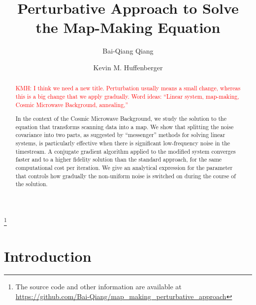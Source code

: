 \documentclass[twocolumn,linenumbers]{aastex631}
\newcommand{\kmh}[1]{\textcolor{red}{KMH: #1}}
\begin{document}
\title{Perturbative Approach to Solve the Map-Making Equation}

\footnote{
The source code and other information are available at \url{https://github.com/Bai-Qiang/map_making_perturbative_approach}
}

\author{Bai-Qiang Qiang}

\author[0000-0001-7109-0099]{Kevin M. Huffenberger}


\begin{abstract}
  \kmh{I think we need a new title.  Perturbation usually means a small change, whereas this is a big change that we apply gradually. Word ideas: ``Linear system, map-making, Cosmic Microwave Background, annealing,''}

In the context of the Cosmic Microwave Background, we study the solution to the equation that transforms scanning data into a map.  We show that splitting the noise covariance into two parts, as suggested by ``messenger'' methods for solving linear systems, is particularly effective when there is significant low-frequency noise in the timestream.  A conjugate gradient algorithm applied to the modified system converges faster and to a higher fidelity solution than the standard approach, for the same computational cost per iteration.
%
We give an analytical expression for the parameter that controls how gradually the non-uniform noise is switched on during the course of the solution. 

\end{abstract}


\section{Introduction} \label{sec:intro}
\end{document}
